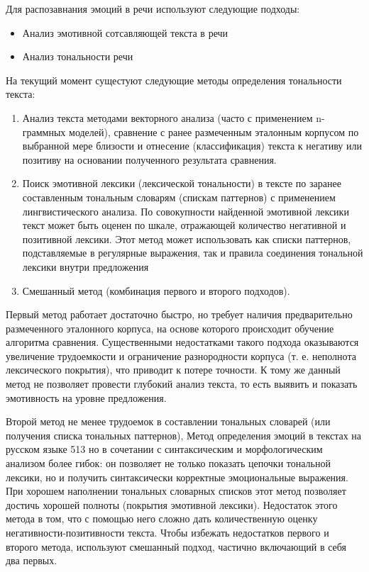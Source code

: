 Для распозавнания эмоций в речи используют следующие подходы:
\begin{itemize}
	\item Анализ эмотивной сотсавляющей текста в речи
	\item Анализ тональности речи
\end{itemize}


На текущий момент сущестуют следующие методы определения тональности текста:
\begin{enumerate}
  \item Анализ текста методами векторного анализа (часто с применением n-граммных моделей), сравнение с ранее размеченным эталонным корпусом по выбранной мере близости и отнесение (классификация) текста к негативу или позитиву на основании полученного результата сравнения.
  \item Поиск эмотивной лексики (лексической тональности) в тексте по заранее составленным тональным словарям (спискам паттернов) с применением лингвистического анализа. По совокупности найденной эмотивной лексики текст может быть оценен по шкале, отражающей количество негативной и позитивной лексики. Этот метод может использовать как списки паттернов, подставляемые в регулярные выражения, так и правила соединения тональной лексики внутри предложения
  \item Смешанный метод (комбинация первого и второго подходов).
\end{enumerate}

Первый метод работает достаточно быстро, но требует наличия предварительно размеченного эталонного корпуса, на основе которого происходит обучение алгоритма сравнения. 
Существенными недостатками такого подхода оказываются увеличение трудоемкости и ограничение разнородности корпуса (т. е.
неполнота лексического покрытия), что приводит к потере точности. К тому же
данный метод не позволяет провести глубокий анализ текста, то есть выявить
и показать эмотивность на уровне предложения.

Второй метод не менее трудоемок в составлении тональных словарей (или получения списка тональных паттернов),
Метод определения эмоций в текстах на русском языке 513
но в сочетании с синтаксическим и морфологическим анализом более гибок:
он позволяет не только показать цепочки тональной лексики, но и получить
синтаксически корректные эмоциональные выражения. При хорошем наполнении тональных словарных списков этот метод позволяет достичь хорошей
полноты (покрытия эмотивной лексики).
Недостаток этого метода в том, что с помощью него сложно дать количественную оценку негативности-позитивности текста. 
Чтобы избежать недостатков первого и второго метода, используют смешанный подход, частично включающий в себя два первых.

